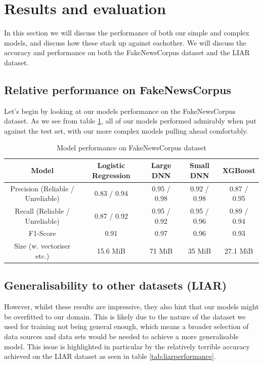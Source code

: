 \section{Results and evaluation}
In this section we will discuss the performance of both our simple and complex models, and discuss how these stack up
against eachother. We will discuss the accuracy and performance on both the FakeNewsCorpus dataset and the LIAR
dataset.

\subsection{Relative performance on FakeNewsCorpus}
Let's begin by looking at our models performance on the FakeNewsCorpus dataset. As we see from table \ref{tab:fakenewsperformance},
all of our models performed admirably when put against the test set, with our more complex models pulling ahead
comfortably.

\begin{table}[htpb]
  \centering
  \caption{Model performance on FakeNewsCorpus dataset}
  \label{tab:fakenewsperformance}

  \begin{tabular}{c|cccc}
    Model & Logistic Regression & Large DNN & Small DNN & XGBoost \\ \hline
    Precision (Reliable / Unreliable) & 0.83 / 0.94 & 0.95 / 0.98 & 0.92 / 0.98 & 0.87 / 0.95 \\ \hline
    Recall (Reliable / Unreliable) & 0.87 / 0.92 & 0.95 / 0.92 & 0.95 / 0.96 & 0.89 / 0.94 \\ \hline
    F1-Score & 0.91 & 0.97 & 0.96 & 0.93 \\ \hline
    Size (w. vectoriser etc.) & 15.6 MiB & 71 MiB & 35 MiB & 27.1 MiB 
  \end{tabular}
\end{table}

\subsection{Generalisability to other datasets (LIAR)}
However, whilst these results are impressive, they also hint that our models might be overfitted to our domain. This is
likely due to the nature of the dataset we used for training not being general enough, which means a broader selection
of data sources and data sets would be needed to achieve a more generalisable model. This issue is highlighted in
particular by the relatively terrible accuracy achieved on the LIAR dataset as seen in table \ref{tab:liarperformance}.

